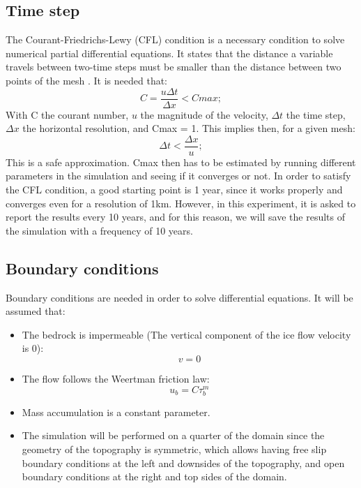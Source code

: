 \documentclass{article}
\begin{document}
\subsection{Time step}
The Courant-Friedrichs-Lewy (CFL) condition is a necessary condition to solve numerical partial differential equations. It states that the distance a variable travels between two-time steps must be smaller than the distance between two points of the mesh \cite[]{courant1967partial}. It is needed that:
\begin{equation}
	C=\frac{u\Delta t}{\Delta x}<Cmax;
\end{equation}
With C the courant number, $u$ the magnitude of the velocity, $\Delta t$ the time step, $\Delta x$ the horizontal resolution, and Cmax = 1. This implies then, for a given mesh:
\begin{equation}
	\Delta t < \frac{\Delta x}{u};
\end{equation}
This is a safe approximation. Cmax then has to be estimated by running different parameters in the simulation and seeing if it converges or not. In order to satisfy the CFL condition, a good starting point is 1 year, since it works properly and converges even for a resolution of 1km.
However, in this experiment, it is asked to report the results every 10 years, and for this reason, we will save the results of the simulation with a frequency of 10 years. 
\subsection{Boundary conditions}
Boundary conditions are needed in order to solve differential equations. It will be assumed that:
\begin{itemize}
	\item The bedrock is impermeable (The vertical component of the ice flow velocity is 0):
	\begin{equation}
		v = 0
	\end{equation}
	\item The flow follows the Weertman friction law:
	\begin{equation}
		u_b = C\tau_b^m
	\end{equation}
	\item Mass accumulation is a constant parameter.
	\item The simulation will be performed on a quarter of the domain since the geometry of the topography is symmetric, which allows having free slip boundary conditions at the left and downsides of the topography, and open boundary conditions at the right and top sides of the domain. 
\end{itemize}
\end{document}
